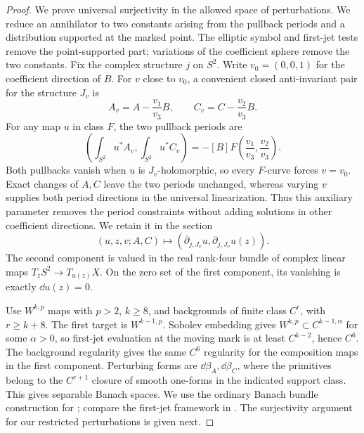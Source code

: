 \begin{proof}
We prove universal surjectivity in the allowed space of perturbations.
We reduce an annihilator to two constants arising from the pullback
periods and a distribution supported at the marked point.  The elliptic
symbol and first-jet tests remove the point-supported part; variations
of the coefficient sphere remove the two constants.
Fix the complex structure $j$ on $S^2$.  Write $v_0=(0,0,1)$ for the
coefficient direction of $B$.  For $v$ close to $v_0$, a convenient
closed anti-invariant pair for the structure $J_v$ is
\begin{equation}\label{eq:pencil-coefficient-pair}
 A_v=A-\frac{v_1}{v_3}B,\qquad
 C_v=C-\frac{v_2}{v_3}B.
\end{equation}
For any map $u$ in class $F$, the two pullback periods are
\[
 \left(\int_{S^2}u^*A_v,\int_{S^2}u^*C_v\right)
 =-[B]F\left(\frac{v_1}{v_3},\frac{v_2}{v_3}\right).
\]
Both pullbacks vanish when $u$ is $J_v$-holomorphic, so every
$F$-curve forces $v=v_0$.  Exact changes of $A,C$ leave the two
periods unchanged, whereas varying $v$ supplies both period directions
in the universal linearization.  Thus this auxiliary parameter removes
the period constraints without adding solutions in other coefficient
directions.  We retain it in the section
\begin{equation}\label{eq:pencil-universal-section}
 (u,z,v;A,C)\longmapsto
 \left(\overline\partial_{j,J_v}u,
       \partial_{j,J_v}u(z)\right).
\end{equation}
The second component is valued in the real rank-four bundle of complex
linear maps $T_zS^2\to T_{u(z)}X$.  On the zero set of the first
component, its vanishing is exactly $\dd u(z)=0$.

Use $W^{k,p}$ maps with $p>2$, $k\geq8$, and backgrounds of finite
class $C^r$, with $r\geq k+8$.  The first target is $W^{k-1,p}$.
Sobolev embedding gives $W^{k,p}\subset C^{k-1,\alpha}$ for some
$\alpha>0$, so first-jet evaluation at the moving mark is at least
$C^{k-2}$, hence $C^6$.  The background regularity gives the same
$C^6$ regularity for the composition maps in the first component.
Perturbing forms are $\dd\beta_A,\dd\beta_C$,
where the primitives belong to the $C^{r+1}$ closure of smooth
one-forms in the indicated support class.  This gives separable
Banach spaces.  We use the ordinary Banach bundle construction for
; compare the first-jet framework in
\cite[Sections~2--3]{OhZhu2008}.  The surjectivity argument for our
restricted perturbations is given next.


\end{proof}
